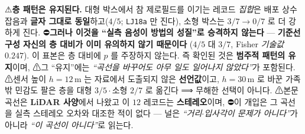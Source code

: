 \documentclass[11pt]{report}
\numberwithin{equation}{chapter}
\numberwithin{figure}{chapter}
\numberwithin{table}{chapter}
\begin{document}
⚠\textbf{층 패턴은 유지된다.} 대형 박스에서 참 제로필드를 이기는 레코드 \emph{집합}은
배포 상수 잡음과 \textbf{글자 그대로 동일}하고($4/5$; \texttt{LJ18a} 만 진다), 소형 박스는
$3/7 \to 0/7$ 로 더 강하게 진다. ⛔\textbf{그러나 이것을 ``실측 음성이 방법의 성질''로
승격하지 않는다} --- \textbf{기준선 구성 자신의 층 대비가 이미 유의하지 않기 때문이다}
($4/5$ 대 $3/7$, Fisher \emph{기술값} $0.247$). 이 표본은 층 대비에 $p$ 를 주장하지 않는다.
즉 확인된 것은 \textbf{범주적 패턴의 유지}이며, ⚠그 ``유지''에는 \emph{``곡선을 바꾸어도
아무 일도 일어나지 않았다''}가 포함된다. ⚠센서 높이 $h = 12$\,m 는 자료에서 도출되지 않은
\textbf{선언값}이고, $h = 30$\,m 로 바꾼 가족 밖 민감도 팔은 층을 대형 $3/5\cdot$소형 $2/7$
로 옮긴다 ⟹ 무해한 선택이 아니다. ⚠본문 곡선은 \textbf{LiDAR 사양}에서 나왔고 이 $12$
레코드는 \textbf{스테레오}이며, ⛔이 개입은 그 곡선을 실측 스테레오 오차와 대조한 적이 없다
--- 널은 \emph{``거리$\cdot$입사각이 문제가 아니다''}가 아니라 \emph{``이 곡선이 아니다''}로
읽는다.
\end{document}

